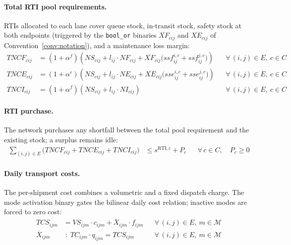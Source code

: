 \paragraph{Total RTI pool requirements.}
RTIs allocated to each lane cover queue stock, in-transit stock,
safety stock at both endpoints (triggered by the \texttt{bool\_or}
binaries $\overline{XF}_{cij}$ and $\overline{XE}_{cij}$
of Convention~\ref{conv:notation}), and a maintenance loss margin:
%
\begin{align}
  TNCF_{cij}
  &= (1+\alpha^{f})\!\left(
       NS_{cij}
       + l_{ij}\cdot NF_{cij}
       + \overline{XF}_{cij}
         \bigl(ssf^{i,c}_{ij}+ssf^{j,c}_{ij}\bigr)
     \right)
  && \forall\,(i,j)\in E,\ c\in C
  \label{eq:pool-full}\\[4pt]
  TNCE_{cij}
  &= (1+\alpha^{e})\!\left(
       NS_{cij}
       + l_{ij}\cdot NE_{cij}
       + \overline{XE}_{cij}
         \bigl(sse^{i,c}_{ij}+sse^{j,c}_{ij}\bigr)
     \right)
  && \forall\,(i,j)\in E,\ c\in C
  \label{eq:pool-empty}\\[4pt]
  TNCI_{cij}
  &= (1+\alpha^{f})\!\left(
       NS_{cij}
       + l_{ij}\cdot NI_{cij}
     \right)
  && \forall\,(i,j)\in E,\ c\in C
  \label{eq:pool-inlay}
\end{align}


\paragraph{RTI purchase.}
The network purchases any shortfall between the total pool
requirement and the existing stock; a surplus remains idle:
%
\begin{align}
  \sum_{(i,j)\in E}\!\bigl(
    TNCF_{cij}+TNCE_{cij}+TNCI_{cij}
  \bigr)
  &\leq s^{\text{RTI},c} + P_{c}
  && \forall\, c\in C,\quad P_{c}\geq 0
  \label{eq:purchase}
\end{align}


\paragraph{Daily transport costs.}
The per-shipment cost combines a volumetric and a fixed dispatch
charge. The mode activation binary gates the bilinear daily cost
relation; inactive modes are forced to zero cost:
%
\begin{align}
  TCS_{ijm}
  &= VS_{ijm}\cdot c_{ijm}
     + \overline{X}_{ijm}\cdot f_{ijm}
  && \forall\,(i,j)\in E,\ m\in\mathcal{M}
  \label{eq:cost-ship}\\[4pt]
  \overline{X}_{ijm}
    &\;:\; TC_{ijm}\cdot q_{ijm} = TCS_{ijm}
  && \forall\,(i,j)\in E,\ m\in\mathcal{M}
  \label{eq:cost-daily}
\end{align}

